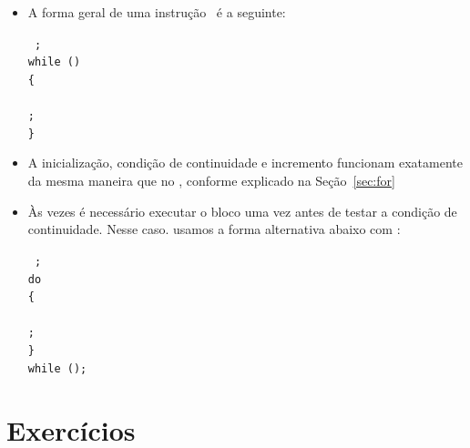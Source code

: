 \begin{itemize}

\item A forma geral de uma instrução \WHILE\ é a seguinte:

{\tt 
{};                                  \\ 
while ()                \\
\{                                                            \\
\TAB {}         \\
\TAB {};                                \\
\}                                                            \\
}

\item A inicialização, condição de continuidade e incremento funcionam exatamente da mesma maneira que no \FOR, conforme explicado na Seção~\ref{sec:for}

\item Às vezes é necessário executar o bloco uma vez antes de testar a condição de continuidade. Nesse caso. usamos a forma alternativa abaixo com \DO:

{\tt 
{};                                  \\ 
do                                                            \\
\{                                                            \\
\TAB {}         \\
\TAB {};                                \\
\}                                                            \\
while ();               \\
}

\end{itemize}


\section{Exercícios}

